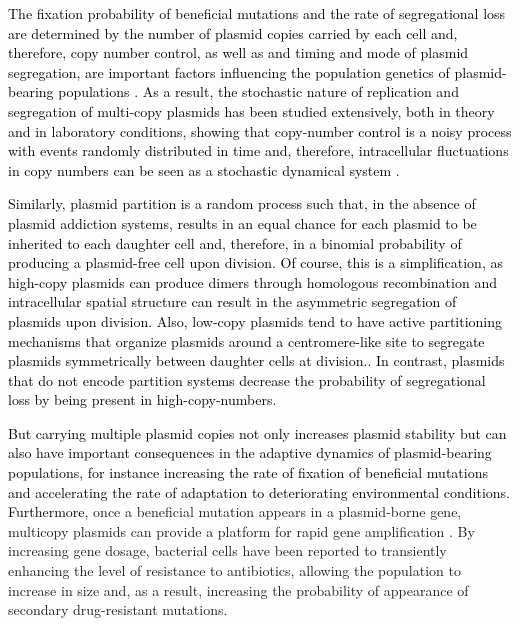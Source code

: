 \documentclass[fleqn,12pt]{wlscirep}
\newcommand{\blue}[1]{\textcolor{black}{#1}}
\begin{document}
\blue{The fixation probability of beneficial mutations and the rate of segregational loss are determined by the number of plasmid copies carried by each cell\cite{stewart1977population} and, therefore, copy number control, as well as  and timing and mode of plasmid segregation, are important factors influencing the population genetics of plasmid-bearing populations \cite{paulsson2002multileveled,rodriguez2019genetic,Ilhan2019}.}
\blue{As a result, the stochastic nature of replication and segregation of multi-copy plasmids has been studied extensively, both in theory\cite{ishii1978random,nordstrom1984equipartition,keasling1989cole1,paulsson2001noise} and in laboratory conditions\cite{nordstrom1984control,novick1987plasmid,del2000plasmid}, showing that copy-number control is a noisy process with events randomly distributed in time \cite{seneta1983some} and, therefore, intracellular fluctuations in copy numbers can be seen as a stochastic dynamical system \cite{keasling1989cole1}. }

\blue{Similarly, plasmid partition is a random process such that, in the absence of plasmid addiction systems\cite{Mochizuki2006,baxter2015plasmid}, results in an equal chance for each plasmid to be inherited to each daughter cell and, therefore, in a binomial probability of producing a plasmid-free cell upon division. Of course, this is a simplification, as high-copy plasmids can produce dimers through homologous recombination\cite{summers1991kinetics} and intracellular spatial structure can result in the asymmetric segregation of plasmids upon division\cite{wang2016quantitative}. Also, low-copy plasmids tend to have active partitioning mechanisms that organize plasmids around a centromere-like site to segregate plasmids symmetrically between daughter cells at division.\cite{salje2010plasmid}. In contrast, plasmids that do not encode partition systems decrease the probability of segregational loss by being present in high-copy-numbers. }

\blue{But carrying multiple plasmid copies not only increases plasmid stability but can also have important consequences in the adaptive dynamics of plasmid-bearing populations, for instance increasing the rate of fixation of beneficial mutations \cite{galitski1995evidence} and accelerating the rate of adaptation to deteriorating environmental conditions\cite{san2016multicopy}. 
Furthermore,} once a beneficial mutation appears in a plasmid-borne gene, multicopy plasmids can provide a platform for rapid gene amplification \cite{nicoloff2019high}.  
By increasing gene dosage, bacterial cells have been reported to transiently enhancing the level of resistance to antibiotics\cite{santos2017naturally}, allowing the population to increase in size and, as a result, increasing the probability of appearance of secondary drug-resistant mutations\cite{Sun2018}. 
\end{document}
